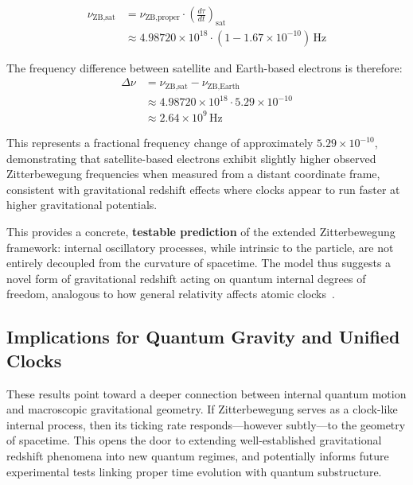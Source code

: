 \documentclass[%
 reprint,
 amsmath,amssymb,
 aps,
]{revtex4-1}
\numberwithin{equation}{section}%
\begin{document}
\begin{equation}
\begin{aligned}
\nu_{\text{ZB,sat}} &= \nu_{\text{ZB,proper}} \cdot \left( \frac{d\tau}{dt} \right)_{\text{sat}} \\
&\approx 4.98720 \times 10^{18} \cdot (1 - 1.67 \times 10^{-10}) \, \text{Hz}
\end{aligned}
\end{equation}

The frequency difference between satellite and Earth-based electrons is therefore:
\begin{equation}
\begin{aligned}
\Delta \nu &= \nu_{\text{ZB,sat}} - \nu_{\text{ZB,Earth}} \\
&\approx 4.98720 \times 10^{18} \cdot 5.29 \times 10^{-10} \\
&\approx 2.64 \times 10^{9} \, \text{Hz}
\end{aligned}
\end{equation}

This represents a fractional frequency change of approximately $5.29 \times 10^{-10}$, demonstrating that satellite-based electrons exhibit slightly higher observed Zitterbewegung frequencies when measured from a distant coordinate frame, consistent with gravitational redshift effects where clocks appear to run faster at higher gravitational potentials.

This provides a concrete, \textbf{testable prediction} of the extended Zitterbewegung framework: internal oscillatory processes, while intrinsic to the particle, are not entirely decoupled from the curvature of spacetime. The model thus suggests a novel form of gravitational redshift acting on quantum internal degrees of freedom, analogous to how general relativity affects atomic clocks~\cite{ludlow2015}.


\subsection{Implications for Quantum Gravity and Unified Clocks}

These results point toward a deeper connection between internal quantum motion and macroscopic gravitational geometry. If Zitterbewegung serves as a clock-like internal process, then its ticking rate responds—however subtly—to the geometry of spacetime. This opens the door to extending well-established gravitational redshift phenomena into new quantum regimes, and potentially informs future experimental tests linking proper time evolution with quantum substructure.
\end{document}
